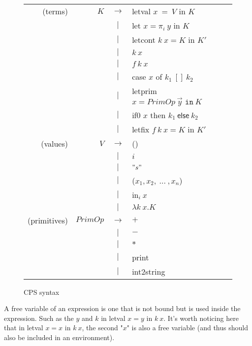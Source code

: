 \documentclass{article}
\theoremstyle{definition}
\theoremstyle{remark}
\numberwithin{equation}{section}
\begin{document}
\begin{figure}[!ht]
  \centering
\begin{tabular}{rrcl}
(terms) & $K$ & $\to$ & \textsf{letval }$x\ =\ V$ \textsf{ in } $K$ \\
        &     & $|$ & \textsf{let }$x = \pi _i\ y$\textsf{ in }$K$\\
        &     & $|$ & \textsf{letcont }$k\ x = K$\textsf{ in }$K'$\\
        &     & $|$ &  $k\ x$ \\
        &     & $|$ & $f\ k\ x$ \\
        &     & $|$ & \textsf{case} $x$ \textsf{of} $k_1\ [\!]\ k_2$\\
        &     & $|$ & \textsf{letprim} $x=PrimOp\ \vec{y}
         \texttt{ in}\ K$\\
        &     & $|$ &\textsf{if0} $x$ \textsf{then} $k_1\ \textsf{else}\ k_2$\\
        &     & $|$ &\textsf{letfix }$f\ k\ x=K$\textsf{ in }$K'$\\

(values) & $V$ & $\to$ & () \\
        &     & $|$ & $i$\\
        &     & $|$ & $"s"$\\
        &     & $|$ & ($x_1,x_2,\ ...\ , x_n$)\\
        &     & $|$ & \textsf{in}$_i\ x$\\
        &     & $|$ &  $\lambda k\ x.K$ \\

(primitives) & $PrimOp$ & $\to$ & $+$ \\
        &     & $|$ & $-$\\
        &     & $|$ & $*$\\
        &     & $|$ & \textsf{print}\\
        &     & $|$ & \textsf{int2string}\\
\end{tabular}
  \caption{CPS syntax}
  \label{fig-sub}
\end{figure}

A free variable of an expression is one that is not bound but is used inside
the expression. Such as the $y$ and $k$ in \textsf{letval }$x=y$
\textsf{in} $k\ x$. It's worth noticing here that in \textsf{letval }$x=x$
\textsf{in} $k\ x$, the second "$x$" is also a free variable (and thus should
also be included in an environment).
\end{document}
